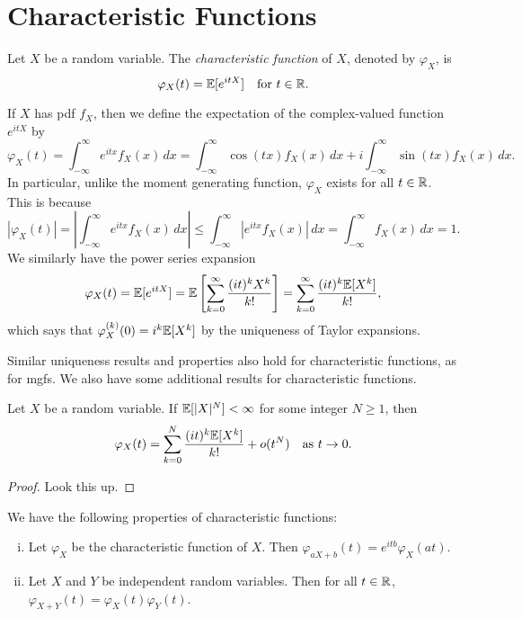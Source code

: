 \section{Characteristic Functions}
\begin{definition}
  Let $X$ be a random variable. The
  \emph{characteristic function} of $X$, denoted
  by $\varphi_X$, is
  \[
    \varphi_X(t) = \mathbb{E}[e^{itX}] \quad \text{for $t \in \mathbb{R}$}.
  \]
\end{definition}

\begin{remark}
  If $X$ has pdf $f_X$, then we define the expectation
  of the complex-valued function $e^{itX}$ by
  \[
    \varphi_X(t) = \int_{-\infty}^\infty e^{itx} f_X(x) \, dx
    = \int_{-\infty}^\infty \cos(tx) f_X(x) \, dx
    + i \int_{-\infty}^\infty \sin(tx) f_X(x) \, dx.
  \]
  In particular, unlike the moment generating
  function, $\varphi_X$ exists for all $t \in \mathbb{R}$.
  This is because
  \[
    |\varphi_X(t)| = \left|\int_{-\infty}^\infty e^{itx} f_X(x) \, dx\right|
    \le \int_{-\infty}^\infty |e^{itx} f_X(x)| \, dx
    = \int_{-\infty}^\infty f_X(x) \, dx = 1.
  \]
  We similarly have the power series expansion
  \[
    \varphi_X(t) = \mathbb{E}[e^{itX}] = \mathbb{E}\left[\sum_{k = 0}^\infty \frac{(it)^k X^k}{k!}\right]
    = \sum_{k = 0}^\infty \frac{(it)^k \mathbb{E}[X^k]}{k!},
  \]
  which says that $\varphi_X^{(k)}(0) = i^k \mathbb{E}[X^k]$
  by the uniqueness of Taylor expansions.
\end{remark}

\begin{remark}
  Similar uniqueness results and properties also hold
  for characteristic functions, as for mgfs.
  We also have some additional results for characteristic functions.
\end{remark}

\begin{theorem}
  Let $X$ be a random variable. If
  $\mathbb{E}[|X|^N] < \infty$ for some integer $N \ge 1$,
  then
  \[
    \varphi_X(t) = \sum_{k = 0}^N \frac{(it)^k \mathbb{E}[X^k]}{k!} + o(t^N)
    \quad \text{as $t \to 0$}.
  \]
\end{theorem}

\begin{proof}
  Look this up.
\end{proof}

\begin{theorem}
  We have the following properties of characteristic
  functions:
  \begin{enumerate}[(i)]
    \item Let $\varphi_X$ be the characteristic
      function of $X$. Then $\varphi_{aX + b}(t) = e^{itb} \varphi_X(at)$.
    \item Let $X$ and $Y$ be independent
      random variables. Then for all $t \in \mathbb{R}$,
      $\varphi_{X + Y}(t) = \varphi_X(t) \varphi_Y(t)$.
  \end{enumerate}
\end{theorem}

